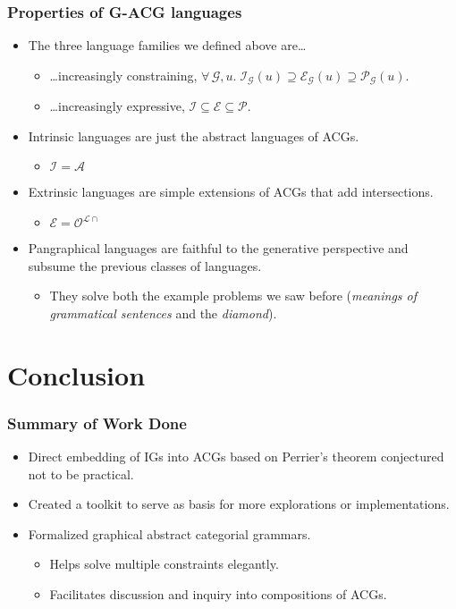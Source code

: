 \documentclass{beamer}
\begin{document}
\begin{frame}
  \frametitle{Properties of G-ACG languages}

  \begin{itemize}
  \item The three language families we defined above are\ldots
    \begin{itemize}
    \item {\ldots}increasingly constraining, $\forall \, \mathcal{G},
      u. \; \mathcal{I}_{\mathcal{G}}(u) \supseteq
      \mathcal{E}_{\mathcal{G}}(u) \supseteq
      \mathcal{P}_{\mathcal{G}}(u)$.
    \item {\ldots}increasingly expressive, $\mathcal{I} \subseteq
      \mathcal{E} \subseteq \mathcal{P}$.
    \end{itemize}
  \vfill
  \item Intrinsic languages are just the abstract languages of ACGs.
    \begin{itemize}
    \item $\mathcal{I} = \mathcal{A}$
    \end{itemize}
  \vfill
  \item Extrinsic languages are simple extensions of ACGs that add
    intersections.
    \begin{itemize}
    \item $\mathcal{E} = \mathcal{O}^{\mathcal{L}{\cap}}$
    \end{itemize}
  \vfill
  \item Pangraphical languages are faithful to the generative
    perspective and subsume the previous classes of languages.
    \begin{itemize}
    \item They solve both the example problems we saw before
      (\emph{meanings of grammatical sentences} and the \emph{diamond}).
    \end{itemize}
  \end{itemize}
\end{frame}


\section{Conclusion}

\begin{frame}
  \frametitle{Summary of Work Done}

  \begin{itemize}
  \item Direct embedding of IGs into ACGs based on Perrier's theorem
    conjectured not to be practical.
  \vfill
  \item Created a toolkit to serve as basis for more explorations or
    implementations.
  \vfill
  \item Formalized graphical abstract categorial grammars.
    \begin{itemize}
    \item Helps solve multiple constraints elegantly.
    \item Facilitates discussion and inquiry into compositions of ACGs.
    \end{itemize}
  \end{itemize}
\end{frame}
\end{document}
